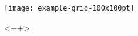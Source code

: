 \begin{figure}[H]
	\centering
	\texttt{[image: example-grid-100x100pt]}
	\caption{<++>}
	\label{fig:<++>}
\end{figure}
